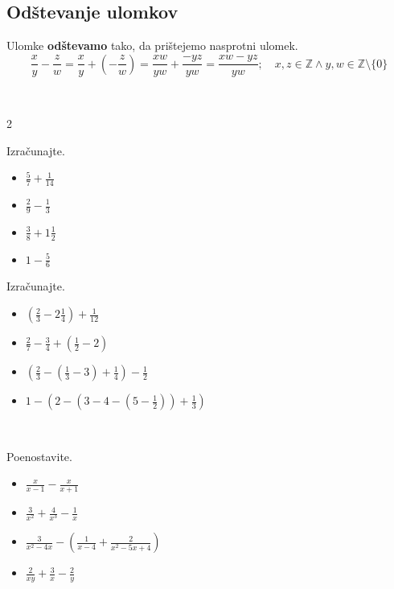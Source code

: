             \subsection*{Odštevanje ulomkov}
                Ulomke \textbf{odštevamo} tako, da prištejemo nasprotni ulomek.
                $$\dfrac{x}{y}-\dfrac{z}{w}=\dfrac{x}{y}+\left(-\dfrac{z}{w}\right)=\dfrac{xw}{yw}+\dfrac{-yz}{yw}=\dfrac{xw-yz}{yw}; \quad x,z\in\mathbb{Z}\land y,w\in\mathbb{Z}\setminus\{0\} $$
            

    
        
            ~

        
\begin{multicols}{2}
    
            \begin{naloga}
                Izračunajte.
                \begin{itemize}
                    \item $\frac{5}{7}+\frac{1}{14}$ 
                    \item $\frac{2}{9}-\frac{1}{3}$ 
                    \item $\frac{3}{8}+1\frac{1}{2}$ 
                    \item $1-\frac{5}{6}$ 
                \end{itemize}
            \end{naloga}
        

        
            \begin{naloga}
                Izračunajte.
                \begin{itemize}
                    \item $\left(\frac{2}{3}-2\frac{1}{4}\right)+\frac{1}{12}$ 
                    \item $\frac{2}{7}-\frac{3}{4}+\left(\frac{1}{2}-2\right)$ 
                    \item $\left(\frac{2}{3}-\left(\frac{1}{3}-3\right)+\frac{1}{4}\right)-\frac{1}{2}$ 
                    \item $1-\left(2-\left(3-4-\left(5-\frac{1}{2}\right)\right)+\frac{1}{3}\right)$ 
                \end{itemize}
            \end{naloga}
        

            ~
        
            \begin{naloga}
                Poenostavite.
                \begin{itemize}
                    \item $\frac{x}{x-1}-\frac{x}{x+1}$ 
                    \item $\frac{3}{x^2}+\frac{4}{x^3}-\frac{1}{x}$ 
                    \item $\frac{3}{x^2-4x}-\left(\frac{1}{x-4}+\frac{2}{x^2-5x+4}\right)$ 
                    \item $\frac{2}{xy}+\frac{3}{x}-\frac{2}{y}$ 
                \end{itemize}
            \end{naloga}
        



\end{multicols}
